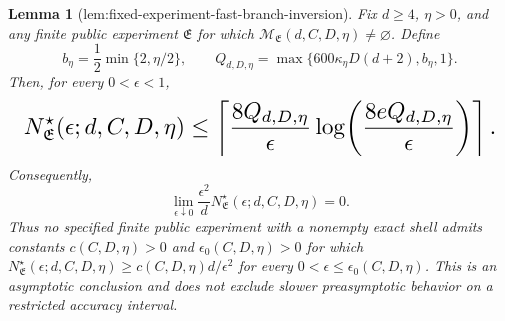 \documentclass{article}
\newtheorem{lemma}{Lemma}
\begin{document}
\begin{lemma}[lem:fixed-experiment-fast-branch-inversion]\label{lem:fixed-experiment-fast-branch-inversion}
Fix \(d\ge4\), \(\eta>0\), and any finite public experiment \(\mathfrak E\) for which \(\mathcal M_{\mathfrak E}(d,C,D,\eta)\ne\varnothing\). Define
\[
b_\eta=\frac12\min\{2,\eta/2\},\qquad
Q_{d,D,\eta}=\max\{600\kappa_\eta D(d+2),b_\eta,1\}.
\]
Then, for every \(0<\epsilon<1\),
\[
\makebox[\linewidth][c]{\resizebox{0.98\linewidth}{!}{\(\displaystyle N^\star_{\mathfrak E}(\epsilon;d,C,D,\eta)
\le
\left\lceil\frac{8Q_{d,D,\eta}}{\epsilon}
\log\!\left(\frac{8eQ_{d,D,\eta}}{\epsilon}\right)\right\rceil .\)}}
\]
Consequently,
\[
\lim_{\epsilon\downarrow0}
\frac{\epsilon^2}{d}N^\star_{\mathfrak E}(\epsilon;d,C,D,\eta)=0.
\]
Thus no specified finite public experiment with a nonempty exact shell admits constants \(c(C,D,\eta)>0\) and \(\epsilon_0(C,D,\eta)>0\) for which \(N^\star_{\mathfrak E}(\epsilon;d,C,D,\eta)\ge c(C,D,\eta)d/\epsilon^2\) for every \(0<\epsilon\le\epsilon_0(C,D,\eta)\). This is an asymptotic conclusion and does not exclude slower preasymptotic behavior on a restricted accuracy interval.
\end{lemma}
\end{document}
